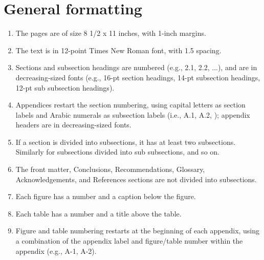 \section{General formatting}
\begin{enumerate}
\item \makebox[0pt][l]{$\square$}\raisebox{.15ex}{$\checkmark$}\hspace{2 mm}The pages are of size 8 1/2 x 11 inches, with 1-inch margins.
\item \makebox[0pt][l]{$\square$}\raisebox{.15ex}{$\checkmark$}\hspace{2 mm}The text is in 12-point Times New Roman font, with 1.5 spacing.
\item \makebox[0pt][l]{$\square$}\raisebox{.15ex}{$\checkmark$}\hspace{2 mm}Sections and subsection headings are numbered (e.g., 2.1, 2.2, ...), and are in decreasing-sized fonts (e.g., 16-pt section headings, 14-pt subsection headings, 12-pt sub subsection headings).
\item \makebox[0pt][l]{$\square$}\raisebox{.15ex}{$\checkmark$}\hspace{2 mm}Appendices restart the section numbering, using capital letters as section labels and Arabic numerals as subsection labels (i.e., A.1, A.2, ); appendix headers are in decreasing-sized fonts.
\item \makebox[0pt][l]{$\square$}\raisebox{.15ex}{$\checkmark$}\hspace{2 mm}If a section is divided into subsections, it has at least two subsections. Similarly for subsections divided into sub subsections, and so on.
\item \makebox[0pt][l]{$\square$}\raisebox{.15ex}{$\checkmark$}\hspace{2 mm}The front matter, Conclusions, Recommendations, Glossary, Acknowledgements, and References sections are not divided into subsections.
\item \makebox[0pt][l]{$\square$}\raisebox{.15ex}{$\checkmark$}\hspace{2 mm}Each figure has a number and a caption below the figure.
\item \makebox[0pt][l]{$\square$}\raisebox{.15ex}{$\checkmark$}\hspace{2 mm}Each table has a number and a title above the table.
\item \makebox[0pt][l]{$\square$}\raisebox{.15ex}{$\checkmark$}\hspace{2 mm}Figure and table numbering restarts at the beginning of each appendix, using a combination of the appendix label and figure/table number within the appendix (e.g., A-1, A-2).

\end{enumerate}
